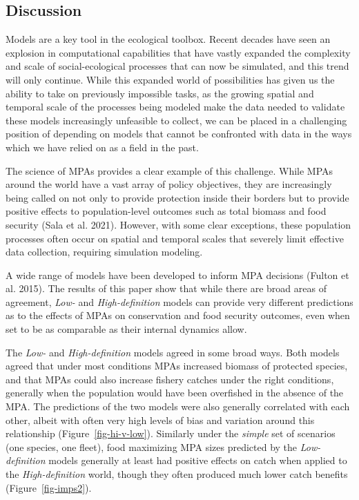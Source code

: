 \documentclass[
  default,
  lineno,
  referee]{sn-jnl}
\begin{document}
\subsection{Discussion}\label{discussion}

Models are a key tool in the ecological toolbox. Recent decades have
seen an explosion in computational capabilities that have vastly
expanded the complexity and scale of social-ecological processes that
can now be simulated, and this trend will only continue. While this
expanded world of possibilities has given us the ability to take on
previously impossible tasks, as the growing spatial and temporal scale
of the processes being modeled make the data needed to validate these
models increasingly unfeasible to collect, we can be placed in a
challenging position of depending on models that cannot be confronted
with data in the ways which we have relied on as a field in the past.

The science of MPAs provides a clear example of this challenge. While
MPAs around the world have a vast array of policy objectives, they are
increasingly being called on not only to provide protection inside their
borders but to provide positive effects to population-level outcomes
such as total biomass and food security (Sala et al. 2021). However,
with some clear exceptions, these population processes often occur on
spatial and temporal scales that severely limit effective data
collection, requiring simulation modeling.

A wide range of models have been developed to inform MPA decisions
(Fulton et al. 2015). The results of this paper show that while there
are broad areas of agreement, \emph{Low-} and \emph{High-definition}
models can provide very different predictions as to the effects of MPAs
on conservation and food security outcomes, even when set to be as
comparable as their internal dynamics allow.

The \emph{Low-} and \emph{High-definition} models agreed in some broad
ways. Both models agreed that under most conditions MPAs increased
biomass of protected species, and that MPAs could also increase fishery
catches under the right conditions, generally when the population would
have been overfished in the absence of the MPA. The predictions of the
two models were also generally correlated with each other, albeit with
often very high levels of bias and variation around this relationship
(Figure~\ref{fig-hi-v-low}). Similarly under the \emph{simple} set of
scenarios (one species, one fleet), food maximizing MPA sizes predicted
by the \emph{Low-definition} models generally at least had positive
effects on catch when applied to the \emph{High-definition} world,
though they often produced much lower catch benefits
(Figure~\ref{fig-imps2}).
\end{document}
